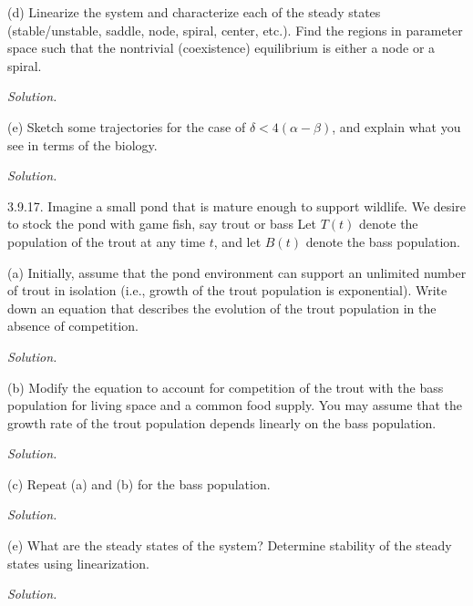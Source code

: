 \documentclass{article}
\begin{document}
(d) Linearize the system and characterize each of the steady states
(stable/unstable, saddle, node, spiral, center, etc.). Find the regions
in parameter space such that the nontrivial (coexistence) equilibrium is
either a node or a spiral.

\textit{Solution.}

\vspace{5mm}

(e) Sketch some trajectories for the case of $\delta < 4(\alpha - \beta)$,
and explain what you see in terms of the biology.

\textit{Solution.}

\newpage

3.9.17. Imagine a small pond that is mature enough to support wildlife.
We desire to stock the pond with game fish, say trout or bass Let $T(t)$
denote the population of the trout at any time $t$, and let $B(t)$
denote the bass population.

(a) Initially, assume that the pond environment can support an unlimited
number of trout in isolation (i.e., growth of the trout population is
exponential). Write down an equation that describes the evolution of the
trout population in the absence of competition.

\textit{Solution.}

\vspace{5mm}

(b) Modify the equation to account for competition of the trout with the
bass population for living space and a common food supply. You may assume
that the growth rate of the trout population depends linearly on the bass
population.

\textit{Solution.}

\vspace{5mm}

(c) Repeat (a) and (b) for the bass population.

\textit{Solution.}

\vspace{5mm}

(e) What are the steady states of the system? Determine stability of the
steady states using linearization.

\textit{Solution.}
\end{document}
